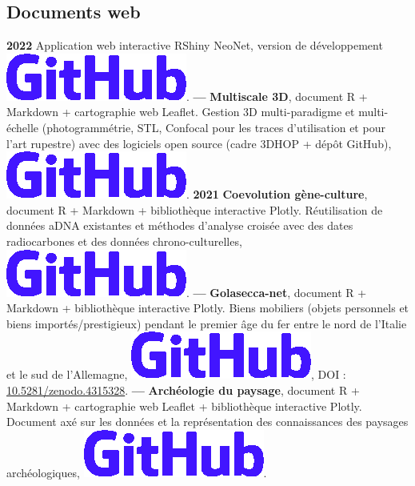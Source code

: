 \documentclass{article}
\begin{document}
\subsection*{Documents web}

\textbf{2022 }Application web interactive \textsf{RShiny} NeoNet, version de développement \href{https://github.com/zoometh/neonet#neonet-app--development-version-}{\includegraphics[scale=0.1]{github-rect.png}}.
\smallbreak
\textbf{--- }\textbf{Multiscale 3D}, document \textsf{R} + \textsf{Markdown} + cartographie web \textsf{Leaflet}. Gestion 3D multi-paradigme et multi-échelle (photogrammétrie, STL, Confocal pour les traces d'utilisation et pour l'art rupestre) avec des logiciels open source (cadre \textsf{3DHOP} + dépôt \textsf{GitHub}), \href{https://zoometh.github.io/rockart/}{\includegraphics[scale=0.1]{github-rect.png}}.
\smallbreak
\textbf{2021 }\textbf{Coevolution gène-culture}, document \textsf{R} + \textsf{Markdown} + bibliothèque interactive \textsf{Plotly}. Réutilisation de données aDNA existantes et méthodes d'analyse croisée avec des dates radiocarbones et des données chrono-culturelles, \href{https://zoometh.github.io/aDNA/}{\includegraphics[scale=0.1]{github-rect.png}}.
\smallbreak
\textbf{--- }\textbf{Golasecca-net}, document \textsf{R} + \textsf{Markdown} + bibliothèque interactive \textsf{Plotly}. Biens mobiliers (objets personnels et biens importés/prestigieux) pendant le premier âge du fer entre le nord de l'Italie et le sud de l'Allemagne, \href{https://zoometh.github.io/golasecca/}{\includegraphics[scale=0.1]{github-rect.png}}, DOI : \href{https://doi.org/10.5281/zenodo.4315328}{10.5281/zenodo.4315328}.
\smallbreak
\textbf{--- }\textbf{Archéologie du paysage}, document \textsf{R} + \textsf{Markdown} + cartographie web \textsf{Leaflet} + bibliothèque interactive \textsf{Plotly}. Document axé sur les données et la représentation des connaissances des paysages archéologiques, \href{https://zoometh.github.io/popland}{\includegraphics[scale=0.1]{github-rect.png}}.
\end{document}
